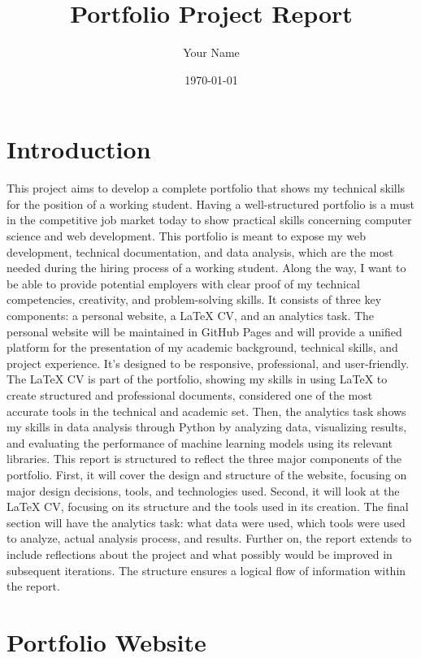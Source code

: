 \documentclass[a4paper,12pt]{article}
\title{Portfolio Project Report}
\author{Your Name}
\date{\today}
\begin{document}
\maketitle
\tableofcontents

\newpage

\section{Introduction}
This project aims to develop a complete portfolio that shows my technical skills for the position of a working student. Having a well-structured portfolio is a must in the competitive job market today to show practical skills concerning computer science and web development. This portfolio is meant to expose my web development, technical documentation, and data analysis, which are the most needed during the hiring process of a working student. Along the way, I want to be able to provide potential employers with clear proof of my technical competencies, creativity, and problem-solving skills.
It consists of three key components: a personal website, a LaTeX CV, and an analytics task. The personal website will be maintained in GitHub Pages and will provide a unified platform for the presentation of my academic background, technical skills, and project experience. It's designed to be responsive, professional, and user-friendly. The LaTeX CV is part of the portfolio, showing my skills in using LaTeX to create structured and professional documents, considered one of the most accurate tools in the technical and academic set. Then, the analytics task shows my skills in data analysis through Python by analyzing data, visualizing results, and evaluating the performance of machine learning models using its relevant libraries.
This report is structured to reflect the three major components of the portfolio. First, it will cover the design and structure of the website, focusing on major design decisions, tools, and technologies used. Second, it will look at the LaTeX CV, focusing on its structure and the tools used in its creation. The final section will have the analytics task: what data were used, which tools were used to analyze, actual analysis process, and results. Further on, the report extends to include reflections about the project and what possibly would be improved in subsequent iterations. The structure ensures a logical flow of information within the report.


\section{Portfolio Website}
\end{document}
